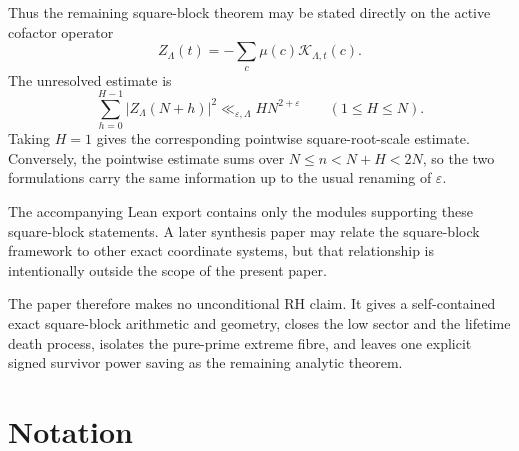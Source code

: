 \documentclass[11pt]{article}
\theoremstyle{definition}
\newcommand{\eps}{\varepsilon}
\newcommand{\1}{\mathbf{1}}
\begin{document}
Thus the remaining square-block theorem may be stated directly on the active cofactor operator
\[
 Z_\Lambda(t)
 =-\sum_c\mu(c)\mathcal K_{\Lambda,t}(c).
\]
The unresolved estimate is
\begin{equation}
 \boxed{
 \sum_{h=0}^{H-1}|Z_\Lambda(N+h)|^2
 \ll_{\eps,\Lambda}H N^{2+\eps}
 \qquad(1\le H\le N).
 }
 \label{eq:conclusion-survivor}
\end{equation}
Taking $H=1$ gives the corresponding pointwise square-root-scale estimate.  Conversely, the pointwise estimate sums over $N\le n<N+H<2N$, so the two formulations carry the same information up to the usual renaming of $\eps$.

The accompanying Lean export contains only the modules supporting these square-block statements.  A later synthesis paper may relate the square-block framework to other exact coordinate systems, but that relationship is intentionally outside the scope of the present paper.

The paper therefore makes no unconditional RH claim.  It gives a self-contained exact square-block arithmetic and geometry, closes the low sector and the lifetime death process, isolates the pure-prime extreme fibre, and leaves one explicit signed survivor power saving as the remaining analytic theorem.

\appendix

\section{Notation}
\end{document}
